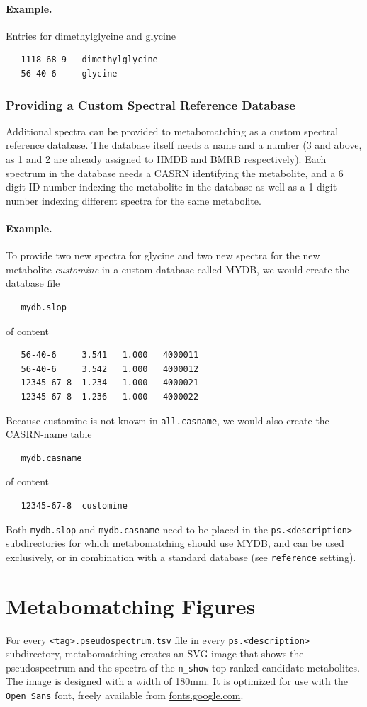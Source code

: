 \documentclass[a4paper,11pt]{article}
\begin{document}
\paragraph{Example.} Entries for dimethylglycine and glycine
\begin{verbatim}
   1118-68-9   dimethylglycine
   56-40-6     glycine
\end{verbatim}
\subsubsection{Providing a Custom Spectral Reference Database}
Additional spectra can be provided to metabomatching as a custom spectral reference database. The database itself needs a name and a number (3 and above, as 1 and 2 are already assigned to HMDB and BMRB respectively). Each spectrum in the database needs a CASRN identifying the metabolite, and a 6 digit ID number indexing the metabolite in the database as well as a 1 digit number indexing different spectra for the same metabolite. 
\paragraph{Example.} To provide two new spectra for glycine and two new spectra for the new metabolite \emph{customine} in a custom database called MYDB, we would create the database file
\begin{verbatim}
   mydb.slop
\end{verbatim}
of content
\begin{verbatim}
   56-40-6     3.541   1.000   4000011
   56-40-6     3.542   1.000   4000012   
   12345-67-8  1.234   1.000   4000021
   12345-67-8  1.236   1.000   4000022   
\end{verbatim}
Because customine is not known in \verb|all.casname|, we would also create the CASRN-name table
\begin{verbatim}
   mydb.casname
\end{verbatim}
of content
\begin{verbatim}
   12345-67-8  customine
\end{verbatim}
Both \verb|mydb.slop| and \verb|mydb.casname| need to be placed in the \verb|ps.<description>| subdirectories for which metabomatching should use MYDB, and can be used exclusively, or in combination with a standard database (see \verb|reference| setting).
\section{Metabomatching Figures\label{sec:svg}}
For every \verb|<tag>.pseudospectrum.tsv| file in every \verb|ps.<description>| subdirectory, metabomatching creates an SVG image that shows the pseudospectrum and the spectra of the \verb|n_show| top-ranked candidate metabolites. The image is designed with a width of 180mm. It is optimized for use with the \texttt{Open Sans} font, freely available from \href{https://fonts.google.com/specimen/Open+Sans}{fonts.google.com}.
\end{document}
